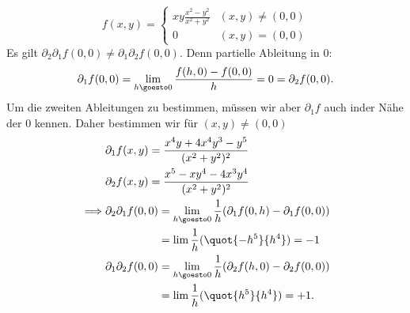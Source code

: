 \begin{antibeispiel*}
  \begin{equation*}
    f(x,y)=\begin{cases}
      xy\frac{x^2-y^2}{x^2+y^2}&(x,y)\neq (0,0)\\
      0 &(x,y)=(0,0)
    \end{cases}
  \end{equation*}
  Es gilt \( \partial_2 \partial_1 f(0,0)\neq \partial_1 \partial_2 f(0,0) \). Denn partielle Ableitung in \( 0 \):
  \begin{equation*}
    \partial_1 f(0,0)=\lim_{h \goesto 0}\frac{f(h,0)-f(0,0)}{h}=0=\partial_2 f(0,0).
  \end{equation*}
  Um die zweiten Ableitungen zu bestimmen, müssen wir aber \( \partial_1 f \) auch inder Nähe der \( 0 \) kennen. Daher bestimmen wir für \( (x,y)\neq (0,0) \)
  \begin{align*}
    &\begin{aligned}[t]
      \partial_1 f(x,y)&=\frac{x^4y+4x^4y^3-y^5}{(x^2+y^2)^2}\\
      \partial_2 f(x,y)&=\frac{x^5-xy^4-4x^3y^4}{(x^2+y^2)^2}
    \end{aligned}\\
    \implies &\begin{aligned}[t]
      \partial_2 \partial_1 f(0,0)&=\lim_{h \goesto 0}\frac{1}{h}(\partial_1 f(0,h)-\partial_1f(0,0))\\
      &=\lim \frac{1}{h}(\quot{-h^5}{h^4})=-1\\
      \partial_1 \partial_2 f(0,0)&=\lim_{h \goesto 0}\frac{1}{h}(\partial_2 f(h,0)-\partial_2 f(0,0))\\
      &=\lim \frac{1}{h}(\quot{h^5}{h^4})=+1.
    \end{aligned}
  \end{align*}
\end{antibeispiel*}
